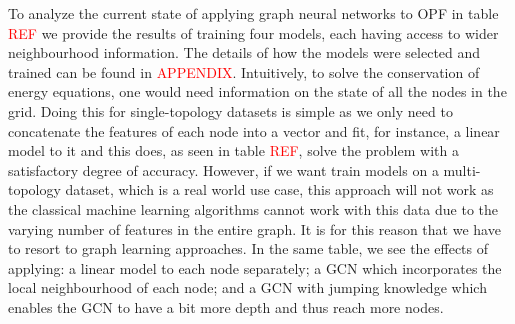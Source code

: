 To analyze the current state of applying graph neural networks to
OPF in table \textcolor{red}{REF} we provide the results of training four models, each having access to
wider neighbourhood information.
The details of how the models were selected and trained can be found in \textcolor{red}{APPENDIX}.
Intuitively, to solve the conservation of energy equations, one would need information on the
state of all the nodes in the grid.
Doing this for single-topology datasets is simple as we only need to concatenate the
features of each node into a vector and fit, for instance, a linear model to it and this does, as seen in
table \textcolor{red}{REF}, solve the problem with a satisfactory degree of accuracy.
However, if we want train models on a multi-topology dataset, which is a real world use case,
this approach will not work as the classical machine learning algorithms cannot work with
this data due to the varying number of features in the entire graph.
It is for this reason that we have to resort to graph learning approaches.
In the same table, we see the effects of applying: a linear model to each node separately;
a GCN which incorporates the local neighbourhood of each node; and a GCN with jumping
knowledge which enables the GCN to have a bit more depth and thus reach more nodes.
